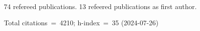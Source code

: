 74 refereed publications. 13 refeered publications as first author.

Total citations~=~4210; h-index~=~35 (2024-07-26)